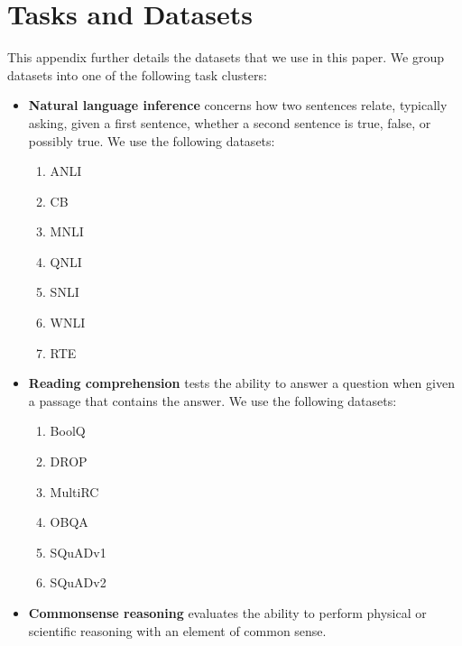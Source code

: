 \clearpage 
\section{Tasks and Datasets}\label{task_details}

This appendix further details the datasets that we use in this paper.
We group datasets into one of the following task clusters:

\begin{itemize}[leftmargin=*]
    \itemsep0em 
    \item \textbf{Natural language inference} concerns how two sentences relate, typically asking, given a first sentence, whether a second sentence is true, false, or possibly true.
    We use the following datasets:
    \begin{enumerate}
        \item ANLI \citep{anli}
        \item CB \citep{de2019commitmentbank}
        \item MNLI \citep{N18-1101}
        \item QNLI \citep{rajpurkar-etal-2018-know}
        \item SNLI \citep{bowman-etal-2015-large}
        \item WNLI \citep{levesque2012winograd}
        \item RTE \citep{10.1007/11736790_9,haim2006second,giampiccolo-etal-2007-third,bentivogli2009fifth}
    \end{enumerate}
    \item \textbf{Reading comprehension} tests the ability to answer a question when given a passage that contains the answer. 
    We use the following datasets:
    \begin{enumerate}
        \item BoolQ \cite{clark-etal-2019-boolq}
        \item DROP \citep{Dua2019DROP}
        \item MultiRC \citep{khashabi-etal-2018-looking}
        \item OBQA \citep{mihaylov-etal-2018-suit}
        \item SQuADv1 \citep{rajpurkar-etal-2016-squad}
        \item SQuADv2 \citep{rajpurkar-etal-2018-know}
    \end{enumerate}
    \item \textbf{Commonsense reasoning} evaluates the ability to perform physical or scientific reasoning with an element of common sense. 

\end{itemize}
